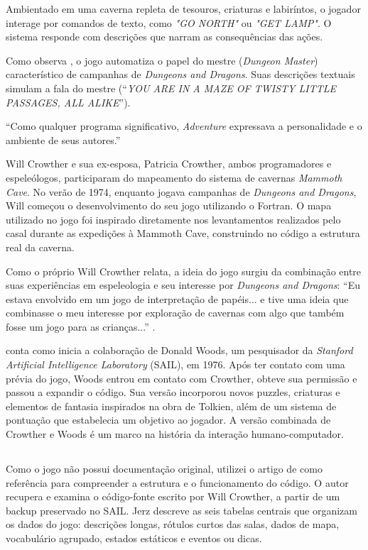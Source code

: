 \documentclass[12pt,a4paper]{article}
\begin{document}
Ambientado em uma caverna repleta de tesouros, criaturas e labiríntos, o jogador interage por comandos de texto, como \textit{"GO NORTH"} ou \textit{"GET LAMP"}. O sistema responde com descrições que narram as consequências das ações.

Como observa \textcite{dibbell1998mytinylife}, o jogo automatiza o papel do mestre (\textit{Dungeon Master}) característico de campanhas de \textit{Dungeons and Dragons}. Suas descrições textuais simulam a fala do mestre (“\textit{YOU ARE IN A MAZE OF TWISTY LITTLE PASSAGES, ALL ALIKE}”).  

“Como qualquer programa significativo, \textit{Adventure} expressava a personalidade e o ambiente de seus autores.” \textcite{levy2010hackers}

Will Crowther e sua ex-esposa, Patricia Crowther, ambos programadores e espeleólogos, participaram do mapeamento do sistema de cavernas \textit{Mammoth Cave}. No verão de 1974, enquanto jogava campanhas de \textit{Dungeons and Dragons}, Will começou o desenvolvimento do seu jogo utilizando o Fortran. O mapa utilizado no jogo foi inspirado diretamente nos levantamentos realizados pelo casal durante as expedições à Mammoth Cave, construindo no código a estrutura real da caverna.

Como o próprio Will Crowther relata, a ideia do jogo surgiu da combinação entre suas experiências em espeleologia e seu interesse por \textit{Dungeons and Dragons}: “Eu estava envolvido em um jogo de interpretação de papéis... e tive uma ideia que combinasse o meu interesse por exploração de cavernas com algo que também fosse um jogo para as crianças...” \textcite{peterson1983genesis}.

\textcite{levy2010hackers} conta como inicia a colaboração de Donald Woods, um pesquisador da \textit{Stanford Artificial Intelligence Laboratory} (SAIL), em 1976. Após ter contato com uma prévia do jogo, Woods entrou em contato com Crowther, obteve sua permissão e passou a expandir o código. Sua versão incorporou novos puzzles, criaturas e elementos de fantasia inspirados na obra de Tolkien, além de um sistema de pontuação que estabelecia um objetivo ao jogador. A versão combinada de Crowther e Woods é um marco na história da interação humano-computador.

\subsection{}
Como o jogo não possui documentação original, utilizei o artigo de \textcite{jerz2007colossal} como referência para compreender a estrutura e o funcionamento do código. O autor recupera e examina o código-fonte escrito por Will Crowther, a partir de um backup preservado no SAIL. Jerz descreve as seis tabelas centrais que organizam os dados do jogo: descrições longas, rótulos curtos das salas, dados de mapa, vocabulário agrupado, estados estáticos e eventos ou dicas.  
\end{document}
